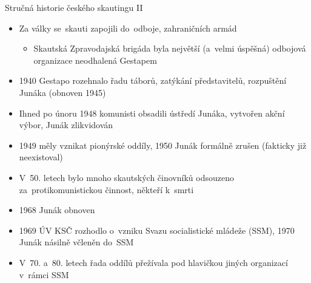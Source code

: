 \documentclass[compress, ucs, xelatex, 11pt, xcolor=dvipsnames, print, aspectratio=169,
	hyperref={
		bookmarks=true,
		unicode=true,
		colorlinks=true,
		pdftitle={Skautska vychovna metoda},
		plainpages=false,
		pdfauthor={Vojtech Zeisek},
		pdfsubject={Skautska vychovna metoda a jeji vyvoj za posledni stoleti a desetileti},
		pdfcreator={XeLaTeX},
		pdfkeywords={Junak, Pedagogika, Skaut, Skauting, Vychovna metoda},
		linkcolor=Red, %
		anchorcolor=ForestGreen, %
		citecolor=ForestGreen, %
		filecolor=ForestGreen, %
		menucolor=ForestGreen, %
		urlcolor=Sepia, %
		pdftex},
	url={hyphens, lowtilde} %
	]{beamer}
\begin{document}
\begin{frame}{Stručná historie českého skautingu II}
	\begin{itemize}
		\item Za války se~skauti zapojili do~odboje, zahraničních armád
		\begin{itemize}
			\item Skautská Zpravodajská brigáda byla největší (a~velmi úspěšná) odbojová organizace neodhalená Gestapem
		\end{itemize}
		\item 1940 Gestapo rozehnalo řadu táborů, zatýkání představitelů, rozpuštění Junáka (obnoven 1945)
		\item Ihned po únoru 1948 komunisti obsadili ústředí Junáka, vytvořen akční výbor, Junák zlikvidován
		\item 1949 měly vznikat pionýrské oddíly, 1950 Junák formálně zrušen (fakticky již neexistoval)
		\item V~50. letech bylo mnoho skautských činovníků odsouzeno za~protikomunistickou činnost, někteří k~smrti
		\item 1968 Junák obnoven
		\item 1969 ÚV KSČ rozhodlo o~vzniku Svazu socialistické mládeže (SSM), 1970 Junák násilně včleněn do~SSM
		\item V~70. a~80. letech řada oddílů přežívala pod hlavičkou jiných organizací v~rámci SSM
	\end{itemize}
\end{frame}
\end{document}
